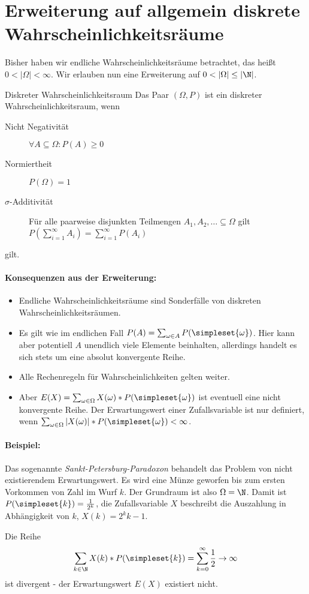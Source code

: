 \section{Erweiterung auf allgemein diskrete Wahrscheinlichkeitsräume}
Bisher haben wir endliche Wahrscheinlichkeitsräume betrachtet, das heißt $0<|\Omega|<\infty$. Wir erlauben nun eine Erweiterung auf $0<|\Omega|\leq|\N|$.

\begin{definition}{Diskreter Wahrscheinlichkeitsraum}
	Das Paar $(\Omega, P)$ ist ein diskreter Wahrscheinlichkeitsraum, wenn
	\begin{description}
		\item[Nicht Negativität] $\forall A\subseteq \Omega: P(A)\geq 0$
		\item[Normiertheit] $P(\Omega)=1$
		\item[$\sigma$-Additivität] Für alle paarweise disjunkten Teilmengen $A_1,A_2,\ldots\subseteq \Omega $ gilt $P(\sum_{i=1}^\infty A_i)=\sum_{i=1}^\infty P(A_i)$ 
	\end{description}
	gilt.
\end{definition}

\paragraph{Konsequenzen aus der Erweiterung:}
\begin{itemize}
	\item Endliche Wahrscheinlichkeitsräume sind Sonderfälle von diskreten Wahrscheinlichkeitsräumen.
	\item Es gilt wie im endlichen Fall $P(A)=\sum_{\omega\in A}P(\simpleset{\omega})$. Hier kann aber potentiell $A$ unendlich viele Elemente beinhalten, allerdings handelt es sich stets um eine absolut konvergente Reihe.
	\item Alle Rechenregeln für Wahrscheinlichkeiten gelten weiter.
	\item Aber $E(X)=\sum_{\omega\in\Omega}X(\omega)*P(\simpleset{\omega})$ ist eventuell eine nicht konvergente Reihe. Der Erwartungswert einer Zufallsvariable ist nur definiert, wenn $\sum_{\omega\in\Omega}|X(\omega)|*P(\simpleset{\omega})<\infty$.
\end{itemize}

\paragraph{Beispiel:}
Das sogenannte \emph{Sankt-Petersburg-Paradoxon} behandelt das Problem von nicht existierendem Erwartungswert.
Es wird eine Münze geworfen bis zum ersten Vorkommen von Zahl im Wurf $k$. Der Grundraum ist also $\Omega=\N$. Damit ist $P(\simpleset{k})=\frac{1}{2^k}$, die Zufallsvariable $X$ beschreibt die Auszahlung in Abhängigkeit von $k$, $X(k)=2^k{k-1}$.

Die Reihe
\begin{equation*}
	\sum_{k\in\N}X(k)*P(\simpleset{k})=\sum_{k=0}^\infty \frac12 \rightarrow \infty
\end{equation*}
ist divergent - der Erwartungswert $E(X)$ existiert nicht.
